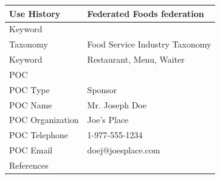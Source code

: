 {\begin{tabular}{|L{0.329\textwidth}|L{0.329\textwidth}|}
        Use History                              & Federated Foods federation                                                                                       \\ \hline
        Keyword                                  &                                                                                                                  \\ \hline
        \hspace*{1.25em}Taxonomy                 & Food Service Industry Taxonomy                                                                                   \\ \hline
        \hspace*{1.25em}Keyword                  & Restaurant, Menu, Waiter                                                                                         \\ \hline
        POC                                      &                                                                                                                  \\ \hline
        \hspace*{1.25em}POC Type                 & Sponsor                                                                                                          \\ \hline
        \hspace*{1.25em}POC Name                 & Mr. Joseph Doe                                                                                                   \\ \hline
        \hspace*{1.25em}POC Organization         & Joe's Place                                                                                                      \\ \hline
        \hspace*{1.25em}POC Telephone            & 1-977-555-1234                                                                                                   \\ \hline
        \hspace*{1.25em}POC Email                & doej@joesplace.com                                                                                               \\ \hline
        References                               &                                                                                                                  \\ \hline

\end{tabular}}
